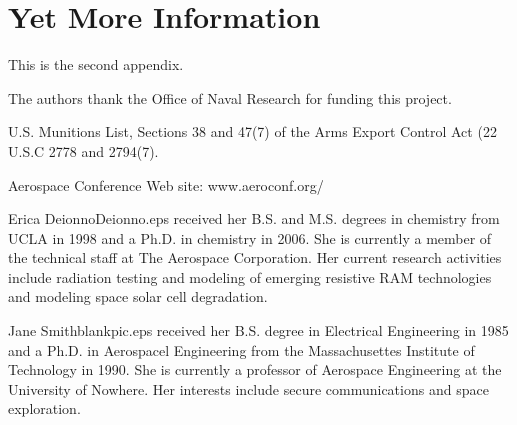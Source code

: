 \documentclass[twocolumn,letterpaper]{IEEEAerospaceCLS}  %
\begin{document}
\section{Yet More Information}    %
This is the second appendix.



\acknowledgments
The authors thank the Office of Naval Research for funding this project.




%
\begin{thebibliography}{1}

U.S. Munitions List, Sections 38 and 47(7) of the Arms Export Control Act (22 U.S.C 2778 and 2794(7).

Aerospace Conference Web site: www.aeroconf.org/

\end{thebibliography}


\thebiography
\begin{biographywithpic}
{Erica Deionno}{Deionno.eps}
received her B.S. and M.S. degrees in chemistry from UCLA in 1998 and a Ph.D. in chemistry in 2006. She is currently a member of the technical staff at The Aerospace Corporation. Her current research activities include radiation testing and modeling of emerging resistive RAM technologies and modeling space solar cell degradation.
\end{biographywithpic} 

\begin{biographywithpic}
{Jane Smith}{blankpic.eps}
received her B.S. degree in Electrical Engineering in 1985 and a Ph.D. in Aerospacel Engineering from the Massachusettes Institute of Technology in 1990. She is currently a professor of Aerospace Engineering at the University of Nowhere. Her interests include secure communications and space exploration.

\end{biographywithpic}
\end{document}
